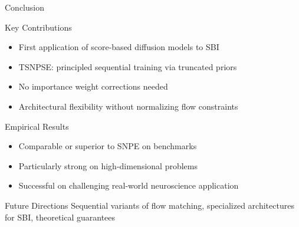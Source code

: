 \documentclass{beamer}
\begin{document}
\begin{frame}{Conclusion}

\begin{block}{Key Contributions}
\begin{itemize}
    \item First application of score-based diffusion models to SBI
    \item TSNPSE: principled sequential training via truncated priors
    \item No importance weight corrections needed
    \item Architectural flexibility without normalizing flow constraints
\end{itemize}
\end{block}

\begin{block}{Empirical Results}
\begin{itemize}
    \item Comparable or superior to SNPE on benchmarks
    \item Particularly strong on high-dimensional problems
    \item Successful on challenging real-world neuroscience application
\end{itemize}
\end{block}

\begin{block}{Future Directions}
Sequential variants of flow matching, specialized architectures for SBI, theoretical guarantees
\end{block}

\end{frame}
\end{document}
